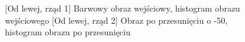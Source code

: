 \documentclass[a4paper,12pt, titlepage]{report}
\begin{document}
\FloatBarrier
\begin{figure}[h]
    \centering
    \qquad
    \caption{[Od lewej, rząd 1] Barwowy obraz wejściowy, histogram obrazu wejściowego [Od lewej, rząd 2] Obraz po przesunięciu o -50, histogram obrazu po przesunięciu}%
    \label{fig:geo_after_grey1}%
\end{figure}
\FloatBarrier
\end{document}
